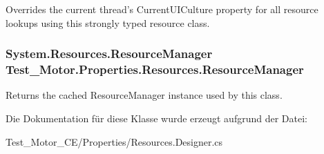 Overrides the current thread's CurrentUICulture property for all resource lookups using this strongly typed resource class. 

\hypertarget{class_test___motor_1_1_properties_1_1_resources_a330443da8bc114186360e46f8a44fc01}{
\subsubsection[{ResourceManager}]{\setlength{\rightskip}{0pt plus 5cm}System.Resources.ResourceManager Test\_\-Motor.Properties.Resources.ResourceManager}}
\label{class_test___motor_1_1_properties_1_1_resources_a330443da8bc114186360e46f8a44fc01}


Returns the cached ResourceManager instance used by this class. 



Die Dokumentation für diese Klasse wurde erzeugt aufgrund der Datei:\begin{DoxyCompactItemize}
\item 
Test\_\-Motor\_\-CE/Properties/Resources.Designer.cs\end{DoxyCompactItemize}
